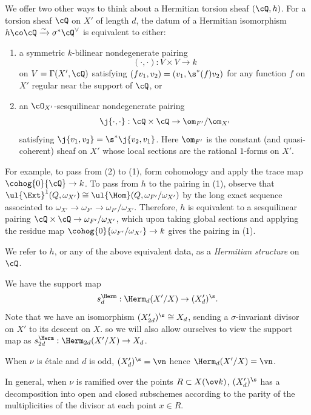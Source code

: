 
We offer two other ways to think about a Hermitian torsion sheaf $(\cQ,h)$. For a torsion sheaf $\cQ$ on $X'$ of length $d$, the datum of a Hermitian isomorphism $h \co \cQ \xrightarrow{\sim} \sigma^* \cQ^\vee$ is equivalent to either:
  \begin{enumerate}
\item a symmetric $k$-bilinear nondegenerate pairing
$$(\cdot,\cdot): V\times V\to k
$$ on $V=\Gamma(X', \cQ)$ satisfying $(fv_{1},v_{2})=(v_{1},\s^{*}(f)v_{2})$ for any  function $f$ on $X'$ regular near the support of $\cQ$, or
\item an $\cO_{X'}$-sesquilinear nondegenerate pairing
$$
\j{\cdot,\cdot}: \cQ\times \cQ\to \om_{F'}/\om_{X'}
$$ satisfying $\j{v_{1},v_{2}}=\s^{*}\j{v_{2},v_{1}}$. Here $\om_{F'}$ is the constant (and quasi-coherent) sheaf on $X'$ whose local sections are the rational $1$-forms on $X'$.
\end{enumerate}
For example, to pass from (2) to (1), form cohomology and apply the trace map $\cohog{0}{\cQ} \rightarrow k$. To pass from $h$ to the pairing in (1), observe that $\ul{\Ext}^1(Q, \omega_{X'}) \cong \ul{\Hom}(Q, \omega_{F'}/\omega_{X'})$ by the long exact sequence associated to $\omega_{X'} \rightarrow  \omega_{F'} \rightarrow \omega_{F'}/\omega_{X'}$. Therefore, $h$ is equivalent to a sesquilinear pairing $\cQ \times \cQ \rightarrow \omega_{F'}/\omega_{X'}$, which upon taking global sections and applying the residue map $\cohog{0}{\omega_{F'}/\omega_{X'}} \rightarrow k$ gives the pairing in (1).

We refer to $h$, or any of the above equivalent data, as a \emph{Hermitian structure} on $\cQ$.

We have the support map
\begin{equation*}
s^{\Herm}_{d}: \Herm_{d}(X'/X)\to (X'_{d})^{\s}.
\end{equation*}
Note that we have an isomorphism $ (X'_{2d})^{\s} \cong X_d$, sending a $\sigma$-invariant divisor on $X'$ to its descent on $X$. so we will also allow ourselves to view the support map as $s^{\Herm}_{2d}: \Herm_{2d}(X'/X)\to X_d$.

\begin{remark}
\notready When $\nu$ is \'etale and $d$ is odd, $(X'_{d})^{\s}=\vn$ hence $\Herm_{d}(X'/X)=\vn$.

In general, when $\nu$ is ramified over the points $R\subset X(\ov k)$, $(X'_{d})^{\s}$ has a decomposition into open and closed subschemes according to the parity of the multiplicities of the divisor at each point $x\in R$.
\end{remark}

